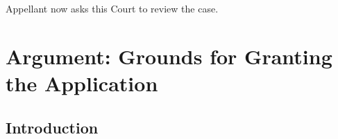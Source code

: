 \documentclass[12pt,\documentclassflag]{michiganCourtOfAppealsBrief}
\begin{document}
Appellant now asks this Court to review the case.






\section{Argument: Grounds for Granting the Application}

\subsection{Introduction}
\end{document}
